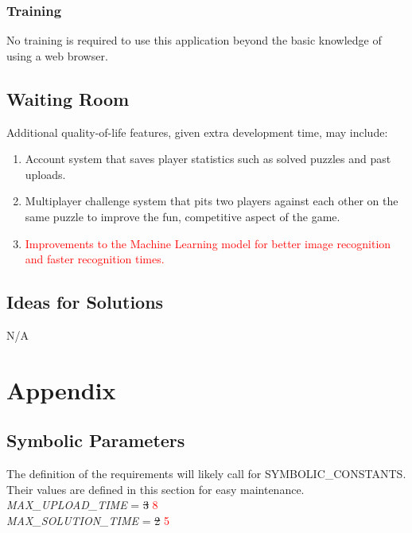 \documentclass[11pt]{article}
\begin{document}
\subsubsection{Training}
No training is required to use this application beyond the basic knowledge of using a web browser.

\subsection{Waiting Room}
Additional quality-of-life features, given extra development time, may include:
\begin{enumerate}
    \item Account system that saves player statistics such as solved puzzles and past uploads.
    \item Multiplayer challenge system that pits two players against each other on the same puzzle to improve the fun, competitive aspect of the game.
    \item \textcolor{red}{Improvements to the Machine Learning model for better image recognition and faster recognition times.}
\end{enumerate}


\subsection{Ideas for Solutions}
N/A





\newpage

\section{Appendix}

\subsection{Symbolic Parameters}

The definition of the requirements will likely call for SYMBOLIC\_CONSTANTS.
Their values are defined in this section for easy maintenance.\\

\noindent \emph{MAX\_UPLOAD\_TIME} = \sout{3} \textcolor{red}{8}\\
\emph{MAX\_SOLUTION\_TIME} = \sout{2} \textcolor{red}{5}
\end{document}
